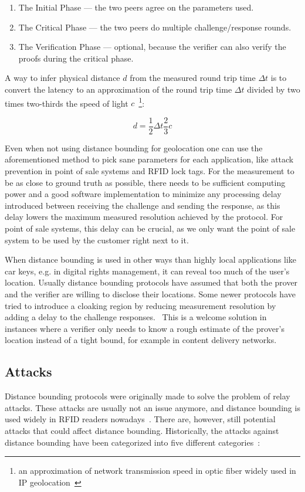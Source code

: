\begin{enumerate}
  \item The Initial Phase --- the two peers agree on the parameters used.
  \item The Critical Phase --- the two peers do multiple challenge/response rounds.
  \item The Verification Phase --- optional, because the verifier can also verify the proofs during the critical phase.
\end{enumerate}

A way to infer physical distance \(d\) from the measured round trip time \(\Delta t\) is to convert the latency to an approximation of the round trip time \(\Delta t\) divided by two times two-thirds the speed of light \(c\)~\footnote{an approximation of network transmission speed in optic fiber widely used in IP geolocation~\cite{Candela2020-am}}:

\begin{equation*}
  d = \frac{1}{2}\Delta t \frac{2}{3}c
\end{equation*}

Even when not using distance bounding for geolocation one can use the aforementioned method to pick sane parameters for each application, like attack prevention in point of sale systems and RFID lock tags. For the measurement to be as close to ground truth as possible, there needs to be sufficient computing power and a good software implementation to minimize any processing delay introduced between receiving the challenge and sending the response, as this delay lowers the maximum measured resolution achieved by the protocol. For point of sale systems, this delay can be crucial, as we only want the point of sale system to be used by the customer right next to it.

When distance bounding is used in other ways than highly local applications like car keys, e.g. in digital rights management, it can reveal too much of the user's location. Usually distance bounding protocols have assumed that both the prover and the verifier are willing to disclose their locations. Some newer protocols have tried to introduce a cloaking region by reducing measurement resolution by adding a delay to the challenge responses.~\cite{Molina-Martinez2018-nw} This is a welcome solution in instances where a verifier only needs to know a rough estimate of the prover's location instead of a tight bound, for example in content delivery networks.

\subsection{Attacks}
Distance bounding protocols were originally made to solve the problem of relay attacks. These attacks are usually not an issue anymore, and distance bounding is used widely in RFID readers nowadays~\cite{Nikov_undated-vv}. There are, however, still potential attacks that could affect distance bounding. Historically, the attacks against distance bounding have been categorized into five different categories~\cite{Boureanu_undated-bn}:


